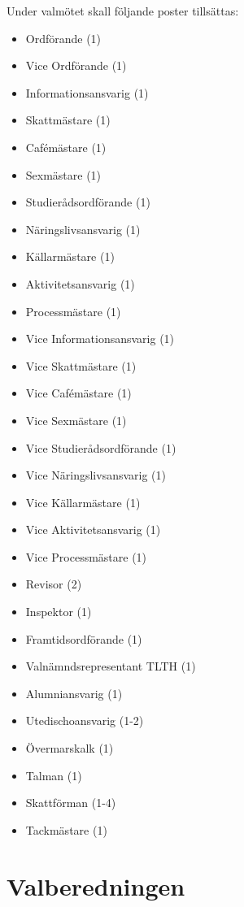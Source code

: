 \documentclass[pdfbookmarks,a4paper,11pt]{article}
\newlength{\itemcollength}
\newenvironment{reglemlista}{%
  \begin{list}{}{%
      \setlength{\labelwidth}{\itemcollength}%
      \setlength{\leftmargin}{\labelwidth + \labelsep}%
      \renewcommand{\makelabel}[1]{%
        \raisebox{0pt}[1ex][0pt]{%
          \makebox[\labelwidth][l]{%
            \parbox[t]{\itemcollength}{%
              \raggedright\hspace{0pt}##1}}}\hfill}%
      }}{%
  \end{list}}
\begin{document}
\begin{reglemlista}
	\item[Valmöte]
	Under valmötet skall följande poster tillsättas:
	\begin{itemize}
		\item Ordförande (1)
		\item Vice Ordförande (1)
		\item Informationsansvarig (1)
		\item Skattmästare (1)
		\item Cafémästare (1)
		\item Sexmästare (1)
		\item Studierådsordförande (1)
		\item Näringslivsansvarig (1)
		\item Källarmästare (1)
		\item Aktivitetsansvarig (1)
        \item Processmästare (1)
		\item Vice Informationsansvarig (1)
		\item Vice Skattmästare (1)
		\item Vice Cafémästare (1)
		\item Vice Sexmästare (1)
		\item Vice Studierådsordförande (1)
		\item Vice Näringslivsansvarig (1)
		\item Vice Källarmästare (1)
		\item Vice Aktivitetsansvarig (1)
        \item Vice Processmästare (1)
		\item Revisor (2)
		\item Inspektor (1)
		\item Framtidsordförande (1)
		\item Valnämndsrepresentant TLTH (1)
		\item Alumniansvarig (1)
		\item Utedischoansvarig (1-2)
		\item Övermarskalk (1)
		\item Talman (1)
		\item Skattförman (1-4)
		\item Tackmästare (1)
	\end{itemize}

\end{reglemlista}

\section{Valberedningen}
\end{document}
